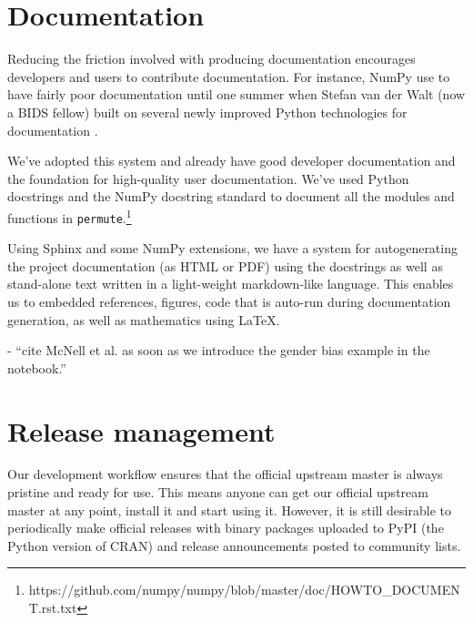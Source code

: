 %
%
%
%
%
%

\section{\label{sec:doc}Documentation}

Reducing the friction involved with producing documentation encourages
developers and users to contribute documentation.  For instance, NumPy use to
have fairly poor documentation until one summer when Stefan van der Walt (now a
BIDS fellow) built on several newly improved Python technologies for
documentation \cite{SciPyProceedings_27}.

We've adopted this system and already have good developer documentation and the
foundation for high-quality user documentation. We've used Python docstrings and
the NumPy docstring standard to document all the modules and functions in
\texttt{permute}.\footnote{https://github.com/numpy/numpy/blob/master/doc/HOWTO\_DOCUMENT.rst.txt}

Using Sphinx and some NumPy extensions, we have a system for autogenerating the
project documentation (as HTML or PDF) using the docstrings as well as
stand-alone text written in a light-weight markdown-like language.  This
enables us to embedded references, figures, code that is auto-run during
documentation generation, as well as mathematics using \LaTeX.

- ``cite McNell et al. as soon as we introduce the gender bias example in the notebook.''

\section{\label{sec:release}Release management}

Our development workflow ensures that the official upstream master is always
pristine and ready for use.  This means anyone can get our official upstream
master at any point, install it and start using it.  However, it is still
desirable to periodically make official releases with binary packages uploaded
to PyPI (the Python version of CRAN) and release announcements posted to
community lists.

